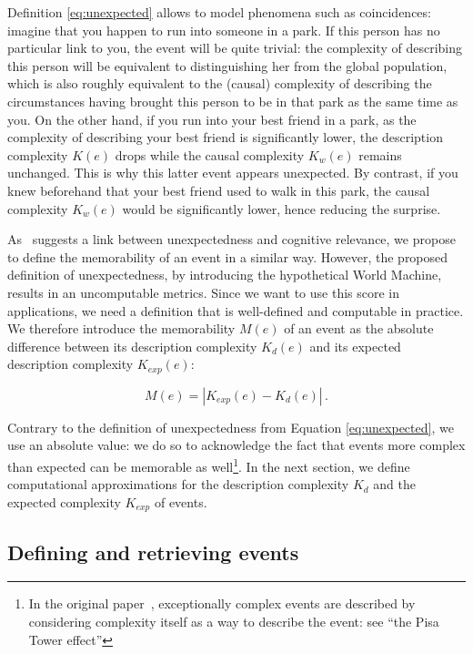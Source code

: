 \documentclass[entropy,article,submit,moreauthors,pdftex]{Definitions/mdpi}
\begin{document}
Definition \ref{eq:unexpected} allows to model phenomena
such as coincidences: imagine that you happen to run into someone in a park.
If this person has no particular link to you, the event will be quite
trivial: the complexity of describing this person will be equivalent to
distinguishing her from the global population, which is also roughly
equivalent to the (causal) complexity of describing the circumstances having brought this person to be in
that park as the same time as you. On the other hand, if you run into your best friend in
a park, as the complexity of describing your best friend is significantly
lower, the description complexity $K(e)$ drops while the causal complexity
$K_w(e)$ remains unchanged. This is why this latter  event appears unexpected. By contrast, if you knew beforehand that your best friend used to walk in this park, the causal complexity $K_w(e)$ would be significantly lower, hence reducing the surprise.

As~\cite{dessalles_coincidences_2011} suggests a link between unexpectedness and cognitive relevance, we propose to define the memorability of an event in a similar way. However, the proposed definition of unexpectedness, by introducing the hypothetical World Machine, results in an uncomputable metrics. Since we want to use this score in applications, we need a definition that is well-defined and computable in practice.
We therefore introduce the memorability $M(e)$ of an event as the absolute difference between its description complexity $K_d(e)$ and its expected description complexity $K_{exp}(e)$:

\begin{equation}
    \label{eq:memorability}
    M(e) = |K_{exp}(e) - K_d(e)|\,.
\end{equation}

Contrary to the definition of unexpectedness from Equation \ref{eq:unexpected}, we use an absolute value: we do so to acknowledge the fact that events more complex than expected can be memorable as well\footnote{In the original paper~\cite{dessalles2011coincidences}, exceptionally complex events are described by considering complexity itself as a way to describe the event: see ``the Pisa Tower effect''\cite{dessalles_pisa_nodate}}. In the next section, we define computational approximations for the description complexity $K_d$ and the expected complexity $K_{exp}$ of events.

\subsection{Defining and retrieving events}
\label{sec:computing}
\end{document}
